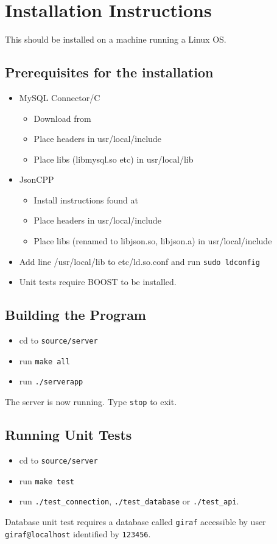 \section{Installation Instructions}
This should be installed on a machine running a Linux OS.

\subsection{Prerequisites for the installation}
\begin{itemize}
\item MySQL Connector/C
\begin{itemize}
	\item Download from \cite{mysqlconnector}
	\item Place headers in usr/local/include
	\item Place libs (libmysql.so etc) in usr/local/lib
\end{itemize}
\item JsonCPP
\begin{itemize}
	\item Install instructions found at \citep{jsoncppinstall}
	\item Place headers in usr/local/include
	\item Place libs (renamed to libjson.so, libjson.a) in usr/local/include
\end{itemize}
\item Add line /usr/local/lib to etc/ld.so.conf and run \lstinline|sudo ldconfig|
\item Unit tests require BOOST to be installed.\citep{boostinstall}
\end{itemize}

\subsection{Building the Program}
\begin{itemize}
\item cd to \lstinline|source/server|
\item run \lstinline|make all|
\item run \lstinline|./serverapp|
\end{itemize}
The server is now running. Type \lstinline|stop| to exit.

\subsection{Running Unit Tests}
\begin{itemize}
\item cd to \lstinline|source/server|
\item run \lstinline|make test|
\item run \lstinline|./test_connection|, \lstinline|./test_database| or 
\lstinline|./test_api|.
\end{itemize}
Database unit test requires a database called \lstinline|giraf| accessible by user \lstinline|giraf@localhost| identified by \lstinline|123456|.

